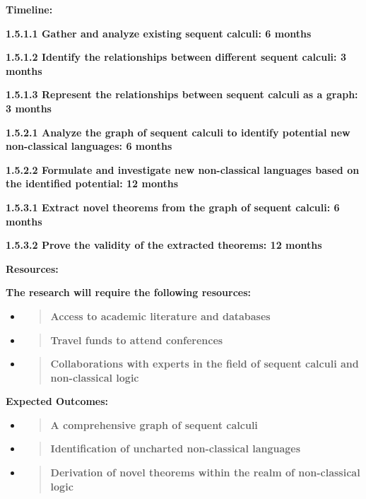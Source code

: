 \textbf{Timeline:}

\textbf{1.5.1.1 Gather and analyze existing sequent calculi: 6 months}

\textbf{1.5.1.2 Identify the relationships between different sequent
calculi: 3 months}

\textbf{1.5.1.3 Represent the relationships between sequent calculi as a
graph: 3 months}

\textbf{1.5.2.1 Analyze the graph of sequent calculi to identify
potential new non-classical languages: 6 months}

\textbf{1.5.2.2 Formulate and investigate new non-classical languages
based on the identified potential: 12 months}

\textbf{1.5.3.1 Extract novel theorems from the graph of sequent
calculi: 6 months}

\textbf{1.5.3.2 Prove the validity of the extracted theorems: 12 months}

\textbf{Resources:}

\textbf{The research will require the following resources:}

\begin{itemize}
\item
  \begin{quote}
  \textbf{Access to academic literature and databases\\
  }
  \end{quote}
\item
  \begin{quote}
  \textbf{Travel funds to attend conferences\\
  }
  \end{quote}
\item
  \begin{quote}
  \textbf{Collaborations with experts in the field of sequent calculi
  and non-classical logic\\
  }
  \end{quote}
\end{itemize}

\textbf{Expected Outcomes:}

\begin{itemize}
\item
  \begin{quote}
  \textbf{A comprehensive graph of sequent calculi\\
  }
  \end{quote}
\item
  \begin{quote}
  \textbf{Identification of uncharted non-classical languages\\
  }
  \end{quote}
\item
  \begin{quote}
  \textbf{Derivation of novel theorems within the realm of non-classical
  logic\\
  }
  \end{quote}
\end{itemize}

